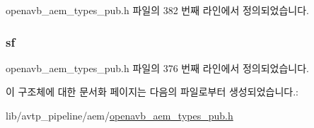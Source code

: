 openavb\+\_\+aem\+\_\+types\+\_\+pub.\+h 파일의 382 번째 라인에서 정의되었습니다.

\subsubsection[{\texorpdfstring{sf}{sf}}]{ sf}\hypertarget{structopenavb__aem__stream__format__iec__61883__6__32bit__t_a153db177c2b7653917dff143e5f755e1}{}\label{structopenavb__aem__stream__format__iec__61883__6__32bit__t_a153db177c2b7653917dff143e5f755e1}


openavb\+\_\+aem\+\_\+types\+\_\+pub.\+h 파일의 376 번째 라인에서 정의되었습니다.



이 구조체에 대한 문서화 페이지는 다음의 파일로부터 생성되었습니다.\+:\begin{DoxyCompactItemize}
\item 
lib/avtp\+\_\+pipeline/aem/\hyperlink{openavb__aem__types__pub_8h}{openavb\+\_\+aem\+\_\+types\+\_\+pub.\+h}\end{DoxyCompactItemize}
